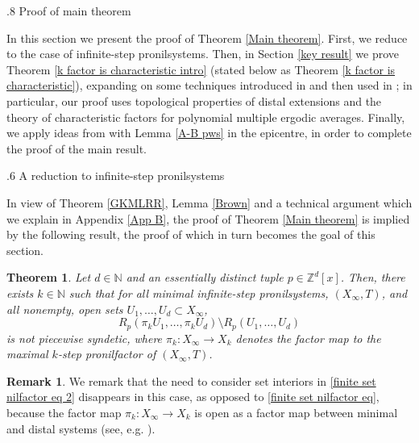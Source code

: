 \documentclass[reqno]{amsart}
\makeatletter
\def\Z{{\mathbb Z}}
\def\N{{\mathbb N}}
\newtheorem{theorem}{Theorem}[section]
\theoremstyle{definition}
\newtheorem*{remark*}{Remark}
\def\section{\@startsection{section}{1}%
  \z@{.5\linespacing\@plus.7\linespacing}
{.8\baselineskip}%
  {\normalfont\fontsize{11}{13}\centering\bfseries}%
}
\def\subsection{\@startsection{subsection}{2}%
  \z@{.4\linespacing\@plus.7\linespacing}
{.6\baselineskip}%
  {\normalfont\centering\bfseries}%
}
\theoremstyle{remark}
\def\N{{\mathbb N}}
\makeatother
\begin{document}
\section{Proof of main theorem}\label{sec main proof}

In this section we present the proof of Theorem 
\ref{Main theorem}. First, we reduce to the case of infinite-step 
pronilsystems. Then, in Section \ref{key result} we prove 
Theorem \ref{k factor is characteristic intro} (stated below 
as Theorem \ref{k factor is characteristic}), 
expanding on some techniques introduced in \cite{Glasner_Huang_Shao_Ye_regionally_arithmetic_prog_nil:2020} and then used in \cite{Ye_Yu}; in 
particular, our proof uses topological properties of distal 
extensions and the theory of characteristic factors for polynomial 
multiple ergodic averages. Finally, we apply ideas from \cite{GKLMRR} 
with Lemma \ref{A-B pws} in the epicentre, in order to complete the proof 
of the main result. 

\subsection{A reduction to infinite-step pronilsystems}\label{reduction sec}

In view of Theorem \ref{GKMLRR}, Lemma \ref{Brown} and a 
technical argument which we explain in Appendix \ref{App B}, 
the 
proof of Theorem \ref{Main theorem} is implied by 
the following result, the proof of which in turn becomes the 
goal of this section. 

\begin{theorem}\label{finite step characteristic for infinite step systems}
Let $d\in \N$ and an essentially distinct tuple 
$p\in \Z^d[x]$. Then, there exists $k\in \N$ such that for all minimal infinite-step pronilsystems, $(X_{\infty},T)$, and all nonempty, open sets $U_1,\ldots,U_d \subset X_{\infty}$, 
\begin{equation}\label{finite set nilfactor eq 2}
R_p(\pi_k U_1,\ldots,\pi_k U_d) \setminus R_p(U_1,\ldots,U_d) 
\end{equation}
is not piecewise syndetic, where $\pi_k:X_{\infty} \to X_k$ denotes the factor map to the maximal $k$-step pronilfactor of $(X_{\infty},T)$.   
\end{theorem}

\begin{remark*}
We remark that the need to consider set interiors in 
\eqref{finite set nilfactor eq 2} disappears in this case, as opposed to \eqref{finite set nilfactor eq}, 
because the factor map $\pi_k:X_{\infty}\to X_k$ is open as a 
factor map between minimal and distal systems (see, e.g. \cite[Chapter 7]{Auslander_minimal_flows_and_extensions:1988}). 
\end{remark*}
\end{document}
